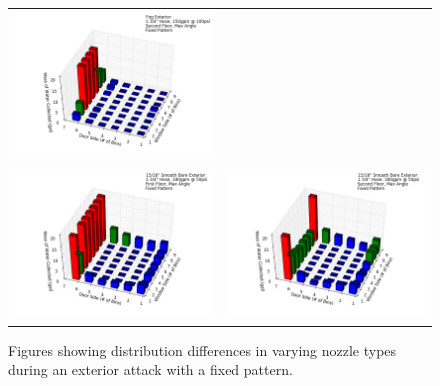 \documentclass{article}
\begin{document}
\begin{figure}[ht]
\begin{tabular*}{\textwidth}{lr}
\includegraphics[width=3.2in]{../ADD_Analysis/Figures/15-12-07_155751_Datafile_Fog_Exterior.png} \\
\includegraphics[width=3.2in]{../ADD_Analysis/Figures/15-12-08_101028_Datafile_15_16in_Smooth_Bore_Exterior.png} & 
\includegraphics[width=3.2in]{../ADD_Analysis/Figures/15-12-07_111118_Datafile_15_16in_Smooth_Bore_Exterior.png} \\
\end{tabular*}
\centering
\caption{Figures showing distribution differences in varying nozzle types during an exterior attack with a fixed pattern.}
\label{fig:Exterior_Varying_Nozzle_Types_Fixed_Pattern}
\end{figure}

\clearpage
\end{document}
